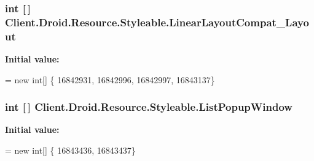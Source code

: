 \subsubsection[{Linear\+Layout\+Compat\+\_\+\+Layout}]{\setlength{\rightskip}{0pt plus 5cm}int \mbox{[}$\,$\mbox{]} Client.\+Droid.\+Resource.\+Styleable.\+Linear\+Layout\+Compat\+\_\+\+Layout\hspace{0.3cm}{\ttfamily [static]}}\label{classClient_1_1Droid_1_1Resource_1_1Styleable_ad297c7f6d223e05cf767c5b74fc37b0b}
{\bfseries Initial value\+:}
\begin{DoxyCode}
= \textcolor{keyword}{new} \textcolor{keywordtype}{int}[]
            \{
                    16842931,
                    16842996,
                    16842997,
                    16843137\}
\end{DoxyCode}
\hypertarget{classClient_1_1Droid_1_1Resource_1_1Styleable_a0785ec4bda25f72116a11e5a2820b293}{}
\subsubsection[{List\+Popup\+Window}]{\setlength{\rightskip}{0pt plus 5cm}int \mbox{[}$\,$\mbox{]} Client.\+Droid.\+Resource.\+Styleable.\+List\+Popup\+Window\hspace{0.3cm}{\ttfamily [static]}}\label{classClient_1_1Droid_1_1Resource_1_1Styleable_a0785ec4bda25f72116a11e5a2820b293}
{\bfseries Initial value\+:}
\begin{DoxyCode}
= \textcolor{keyword}{new} \textcolor{keywordtype}{int}[]
            \{
                    16843436,
                    16843437\}
\end{DoxyCode}
\hypertarget{classClient_1_1Droid_1_1Resource_1_1Styleable_a8e10ab39fa7c36fab0447a1a10fa35ea}{}
